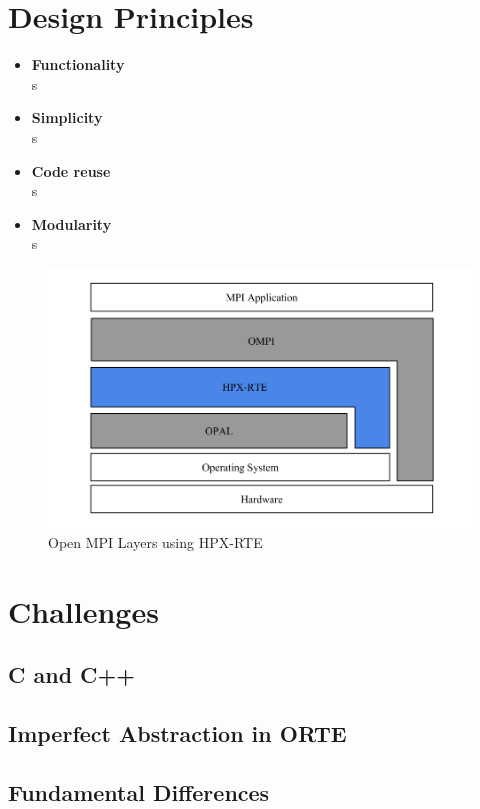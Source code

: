 \section{Design Principles}
\label{sec:design}

\begin{itemize}
\item \textbf{Functionality}\\
  s
\item \textbf{Simplicity}\\
  s
\item \textbf{Code reuse}\\
  s
\item \textbf{Modularity}\\
s
\end{itemize}

\begin{figure}[h!]
\centering
\includegraphics[scale=0.4]{images/open-mpi-layers-hpx-rte.png}
\caption[Open MPI Layers using HPX-RTE]{Open MPI Layers using HPX-RTE}
\label{fig:open-mpi-layers-hpx-rte}
\end{figure}

\section{Challenges}
\label{sec:challenges}

\subsection{C and C++}
\subsection{Imperfect Abstraction in ORTE}
\subsection{Fundamental Differences}

